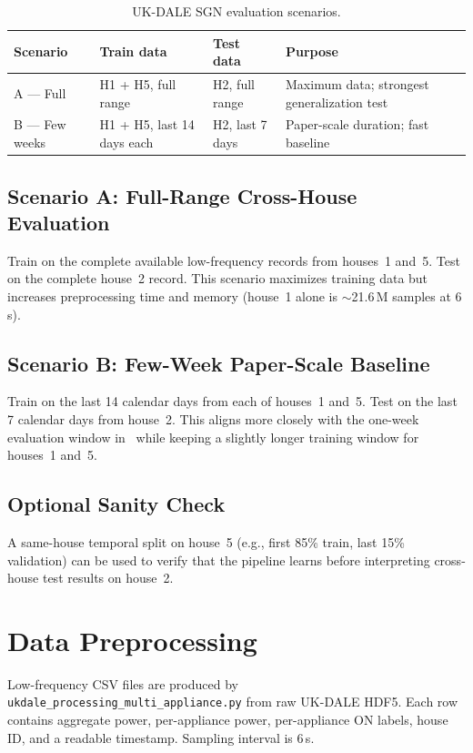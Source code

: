 \documentclass[conference]{IEEEtran}
\begin{document}
\begin{table}[htbp]
\caption{UK-DALE SGN evaluation scenarios.}
\label{tab:scenarios}
\centering
\small
\begin{tabular}{@{}lp{1.8cm}p{1.8cm}p{1.6cm}@{}}
\toprule
\textbf{Scenario} & \textbf{Train data} & \textbf{Test data} & \textbf{Purpose} \\
\midrule
A --- Full & H1 + H5, full range & H2, full range & Maximum data; strongest generalization test \\
B --- Few weeks & H1 + H5, last 14 days each & H2, last 7 days & Paper-scale duration; fast baseline \\
\bottomrule
\end{tabular}
\end{table}

\subsection{Scenario A: Full-Range Cross-House Evaluation}
Train on the complete available low-frequency records from houses~1 and~5.
Test on the complete house~2 record.
This scenario maximizes training data but increases preprocessing time and memory (house~1 alone is $\sim$21.6\,M samples at 6\,s).

\subsection{Scenario B: Few-Week Paper-Scale Baseline}
Train on the last 14 calendar days from each of houses~1 and~5.
Test on the last 7 calendar days from house~2.
This aligns more closely with the one-week evaluation window in~\cite{shin2019sgn} while keeping a slightly longer training window for houses~1 and~5.

\subsection{Optional Sanity Check}
A same-house temporal split on house~5 (e.g., first 85\% train, last 15\% validation) can be used to verify that the pipeline learns before interpreting cross-house test results on house~2.

\section{Data Preprocessing}
Low-frequency CSV files are produced by \texttt{ukdale\_processing\_multi\_appliance.py} from raw UK-DALE HDF5.
Each row contains aggregate power, per-appliance power, per-appliance ON labels, house ID, and a readable timestamp.
Sampling interval is 6\,s.
\end{document}
